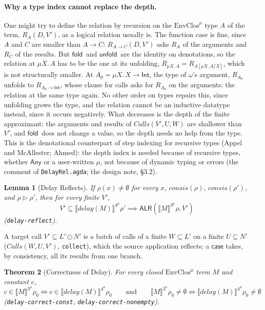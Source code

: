 \documentclass[10pt]{article}
\theoremstyle{acmplain}
\newtheorem{theorem}{Theorem}[section]
\newtheorem{lemma}[theorem]{Lemma}
\newcommand{\SEM}[1]{\llbracket #1 \rrbracket}
\newcommand{\key}[1]{\mathsf{#1}}
\newcommand{\pass}[1]{\mathit{#1}}
\newcommand{\NE}{\neq\emptyset}
\newcommand{\ApproxLR}[2]{\mathsf{ALR}(#1, #2)}
\newcommand{\consis}{\mathit{consis}}
\newcommand{\TAny}{\key{Any}}
\newcommand{\Ml}[1]{\textrm{#1}^{\mu}}                  %
\newcommand{\Mmu}[2]{\mu #1.\,#2}                         %
\newcommand{\Munroll}[2]{#2[\mu #1.\,#2/#1]}              %
\newcommand{\Mfold}{\key{fold}\,}
\newcommand{\Munfold}{\key{unfold}\,}
\begin{document}
\paragraph{Why a type index cannot replace the depth.} One might try to
define the relation by recursion on the $\Ml{EnvClos}$ type $A$ of the term,
$R_A(D, V')$, as a logical relation usually is. The function case is fine,
since $A$ and $C$ are smaller than $A \rightarrow C$:
$R_{A \rightarrow C}(D, V')$ asks $R_A$ of the arguments and $R_C$ of the
results. But $\Mfold$ and $\Munfold$ are the identity on denotations, so
the relation at $\Mmu{X}{A}$ has to be the one at its unfolding,
$R_{\Mmu{X}{A}} = R_{\Munroll{X}{A}}$, which is not structurally smaller.
At $A_0 = \Mmu{X}{X \rightarrow \key{Int}}$, the type of $\omega$'s
argument, $R_{A_0}$ unfolds to $R_{A_0 \rightarrow \key{Int}}$, whose
clause for calls asks for $R_{A_0}$ on the arguments: the relation at the
same type again. No other order on types repairs this, since unfolding
grows the type, and the relation cannot be an inductive datatype instead,
since it occurs negatively. What decreases is the depth of the finite
approximant: the arguments and results of $\mathit{Calls}(V', U, W)$ are
shallower than $V'$, and $\Mfold$ does not change a value, so the depth
needs no help from the type. This is the denotational counterpart of step
indexing for recursive types (Appel and McAllester; Ahmed): the depth
index is needed because of recursive types, whether $\TAny$ or a
user-written $\mu$, not because of dynamic typing or errors (the comment
of \texttt{DelayRel.agda}; the design note, \S3.2).

\begin{lemma}[Delay Reflects]\label{lem:m-den-delay-reflect}
If $\rho(x) \NE$ for every $x$, $\consis(\rho)$, $\consis(\rho')$, and $\rho \rhd \rho'$,
then for every finite $V'$,
\[ V' \subseteq \SEM{\pass{delay}(M)}^{\Ml{4}}\rho' \implies \ApproxLR{\SEM{M}^{\Ml{3}}\rho}{V'} \]
(\texttt{delay-reflect}).
\end{lemma}
A target call $V' \subseteq L' \odot N'$ is a batch of calls of a finite
$W \subseteq L'$ on a finite $U \subseteq N'$ ($\mathit{Calls}(W, U, V')$,
\texttt{collect}), which the source application reflects; a $\key{case}$
takes, by consistency, all its results from one branch.

\begin{theorem}[Correctness of Delay]\label{thm:m-den-delay}
For every closed $\Ml{EnvClos}$ term $M$ and constant $c$,
\[
  c \in \SEM{M}^{\Ml{3}}\rho_0 \iff c \in \SEM{\pass{delay}(M)}^{\Ml{4}}\rho_0
  \qquad\text{and}\qquad
  \SEM{M}^{\Ml{3}}\rho_0 \NE \iff \SEM{\pass{delay}(M)}^{\Ml{4}}\rho_0 \NE
\]
(\texttt{delay-correct-const}, \texttt{delay-correct-nonempty}).
\end{theorem}
\end{document}
